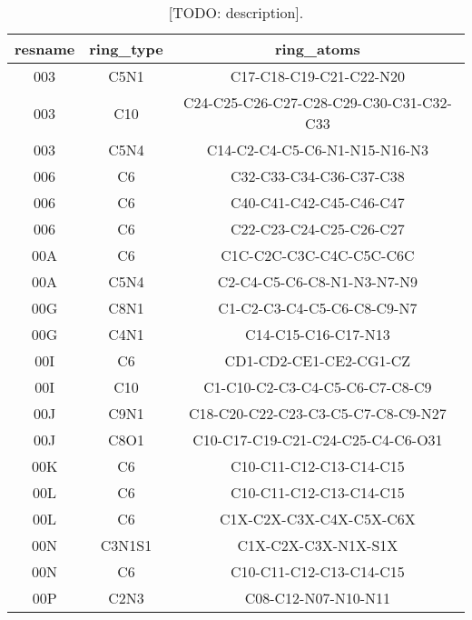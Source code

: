 \begin{table}[H]
  \caption{\label{tab:appx1/aromatic_ligand} [TODO: description].}
  \centering
  \begin{tabular}{ccc}
    \hline
    resname & ring\_type & ring\_atoms                             \\ \hline
    003     & C5N1       & C17-C18-C19-C21-C22-N20                 \\
    003     & C10        & C24-C25-C26-C27-C28-C29-C30-C31-C32-C33 \\
    003     & C5N4       & C14-C2-C4-C5-C6-N1-N15-N16-N3           \\
    006     & C6         & C32-C33-C34-C36-C37-C38                 \\
    006     & C6         & C40-C41-C42-C45-C46-C47                 \\
    006     & C6         & C22-C23-C24-C25-C26-C27                 \\
    00A     & C6         & C1C-C2C-C3C-C4C-C5C-C6C                 \\
    00A     & C5N4       & C2-C4-C5-C6-C8-N1-N3-N7-N9              \\
    00G     & C8N1       & C1-C2-C3-C4-C5-C6-C8-C9-N7              \\
    00G     & C4N1       & C14-C15-C16-C17-N13                     \\
    00I     & C6         & CD1-CD2-CE1-CE2-CG1-CZ                  \\
    00I     & C10        & C1-C10-C2-C3-C4-C5-C6-C7-C8-C9          \\
    00J     & C9N1       & C18-C20-C22-C23-C3-C5-C7-C8-C9-N27      \\
    00J     & C8O1       & C10-C17-C19-C21-C24-C25-C4-C6-O31       \\
    00K     & C6         & C10-C11-C12-C13-C14-C15                 \\
    00L     & C6         & C10-C11-C12-C13-C14-C15                 \\
    00L     & C6         & C1X-C2X-C3X-C4X-C5X-C6X                 \\
    00N     & C3N1S1     & C1X-C2X-C3X-N1X-S1X                     \\
    00N     & C6         & C10-C11-C12-C13-C14-C15                 \\
    00P     & C2N3       & C08-C12-N07-N10-N11                     \\ \hline
  \end{tabular}
\end{table}


